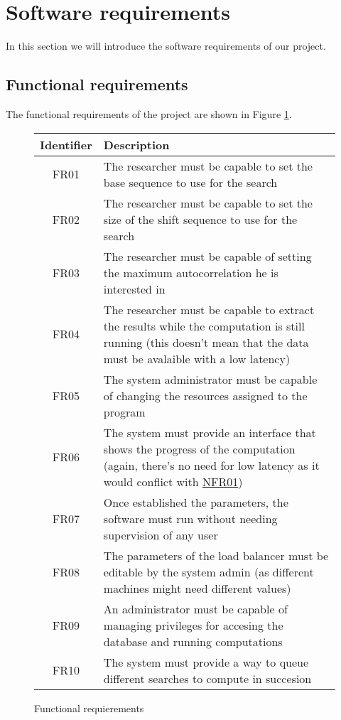 \section{Software requirements}

In this section we will introduce the software requirements of our project.

\subsection{Functional requirements}

The functional requirements of the project are shown in Figure
\ref{functional:fig}.


\begin{figure}[ht!]

  \begin{center}
    \begin{tabular}{||c | p{12cm}||}
      \hline
      Identifier & Description \\
      \hline
      \hline
      FR01 \label{FR01} & The researcher must be capable to set the base
      sequence to use for the search \\
      \hline
      FR02 \label{FR02} & The researcher must be capable to set the size
      of the shift sequence to use for the search\\
      \hline
      FR03 \label{FR03} & The researcher must be capable of setting the maximum
      autocorrelation he is interested in \\
      \hline
      FR04 \label{FR04} & The researcher must be capable to extract the
      results while the computation is still running (this doesn't mean that
      the data must be avalaible with a low latency)\\
      \hline
      FR05 \label{FR05} & The system administrator must be capable of changing
      the resources assigned to the program\\
      \hline
      FR06 \label{FR06} & The system must provide an interface that shows
      the progress of the computation (again, there's no need for low latency
      as it would conflict with \hyperref[NFR01]{NFR01})\\
      \hline
      FR07 \label{FR07} & Once established the parameters, the software must
      run without needing supervision of any user \\
      \hline
      FR08 \label{FR08} & The parameters of the load balancer must be editable
      by the system admin (as different machines might need different values)
      \\
      \hline
      FR09 \label{FR09} & An administrator must be capable of managing
      privileges for accesing the database and running computations\\
      \hline
      FR10 \label{FR10} & The system must provide a way to queue different
      searches to compute in succesion\\
      \hline
    \end{tabular}
  \end{center}

  \caption{Functional requierements}
  \label{functional:fig}
\end{figure}


